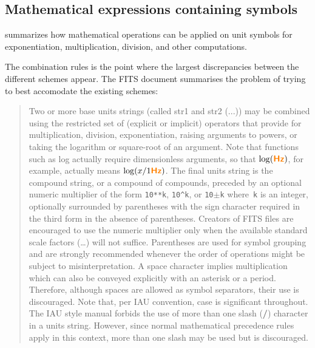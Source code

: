 \documentclass[11pt,notitlepage,onecolumn]{ivoa}
\newcommand{\unit}[1]{\textbf{\textsf{\color{orange}#1}}}
\begin{document}
\subsection{Mathematical expressions containing symbols}

 summarizes how mathematical operations can be applied on
unit symbols for exponentiation, multiplication, division, and other computations.



The combination rules is the point where the largest discrepancies between the
different schemes appear. The FITS document summarises the problem of
trying to best accomodate the existing schemes:
\label{sec:fitsquote}
\begin{quote}
Two or more base units strings (called str1 and str2 (...)) may be combined using
the restricted set of (explicit or implicit) operators that provide
for multiplication, division, exponentiation, raising arguments
to powers, or taking the logarithm or square-root of an
argument. Note that functions such as log actually require dimensionless
arguments, so that $\log(\unit{Hz})$, for example, actually
means $\log(x/1 \unit{Hz})$. The final units string is the compound
string, or a compound of compounds, preceded by an
optional numeric multiplier of the form \texttt{10**k}, \texttt{10\^{}k}, or \texttt{10$\pm$k}
where~\texttt k is an integer, optionally surrounded by parentheses with
the sign character required in the third form in the absence of 
parentheses. Creators of FITS files are encouraged to use the
numeric multiplier only when the available standard scale factors
(\dots) will not suffice. Parentheses are used for symbol
grouping and are strongly recommended whenever the order
of operations might be subject to misinterpretation. A space
character implies multiplication which can also be conveyed explicitly
with an asterisk or a period. Therefore, although spaces
are allowed as symbol separators, their use is discouraged. Note
that, per IAU convention, case is significant throughout. The IAU
style manual forbids the use of more than one slash (\unit{/}) character
in a units string. However, since normal mathematical precedence
rules apply in this context, more than one slash may be
used but is discouraged.


\end{quote}
\end{document}
